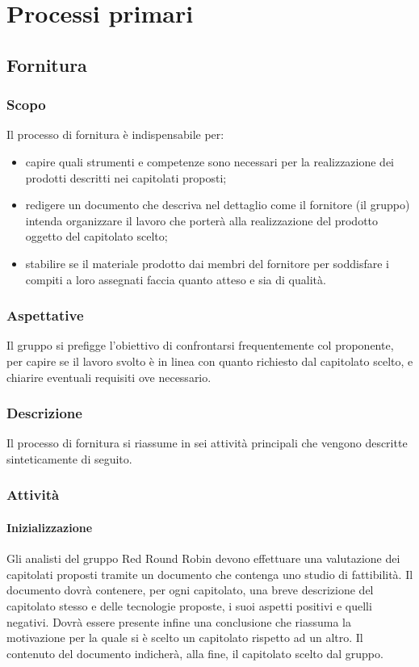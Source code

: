 \section{Processi primari} 


\subsection{Fornitura}

	\subsubsection{Scopo}
	Il processo di fornitura è indispensabile per:
	\begin{itemize}
	\item capire quali strumenti e competenze sono necessari per la realizzazione dei prodotti descritti nei capitolati proposti;
	\item redigere un documento che descriva nel dettaglio come il fornitore (il gruppo) intenda organizzare il lavoro che porterà alla realizzazione del prodotto oggetto del capitolato scelto;
	\item stabilire se il materiale prodotto dai membri del fornitore per soddisfare i compiti a loro assegnati faccia quanto atteso e sia di qualità.    
	\end{itemize}
 	\subsubsection{Aspettative}
	Il gruppo si prefigge l'obiettivo di confrontarsi frequentemente col proponente, per capire se il lavoro svolto è in linea con quanto richiesto dal capitolato scelto, e chiarire eventuali requisiti ove necessario.
	\subsubsection{Descrizione}
	Il processo di fornitura si riassume in sei attività principali che vengono descritte sinteticamente di seguito. 
	\subsubsection{Attività}
		
		\paragraph{Inizializzazione}
			Gli analisti del gruppo Red Round Robin devono effettuare una valutazione dei capitolati proposti tramite un documento che contenga uno studio di fattibilità. 
			Il documento dovrà contenere, per ogni capitolato, una breve descrizione del capitolato stesso e delle tecnologie proposte, i suoi aspetti positivi e quelli negativi. Dovrà essere presente infine una conclusione che riassuma la motivazione per la quale si è scelto un capitolato rispetto ad un altro. 
			Il contenuto del documento indicherà, alla fine, il capitolato scelto dal gruppo.
